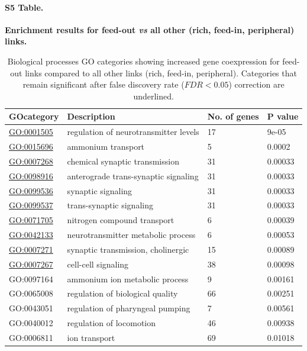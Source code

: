 \documentclass[10pt,letterpaper]{article}
\begin{document}
\paragraph*{S5 Table.}
{\bf Enrichment results for feed-out \textit{vs} all other (rich, feed-in, peripheral) links.}
\begin{table}[]
\centering
\caption{Biological processes GO categories showing increased gene coexpression for feed-out links compared to all other links (rich, feed-in, peripheral). 
Categories that remain significant after false discovery rate ($FDR < 0.05$)  correction are underlined.}
\label{enrichmentFeedOUT}
\begin{tabular}{llll}
\hline
\textbf{GOcategory} & \textbf{Description}                          & \textbf{No. of genes} & \textbf{P value} \\ \hline
\underline{GO:0001505}    & regulation of neurotransmitter levels & 17                & 9e-05         \\
\underline{GO:0015696}    & ammonium transport                    & 5                 & 0.0002        \\
\underline{GO:0007268}    & chemical synaptic transmission        & 31                & 0.00033       \\
\underline{GO:0098916}    & anterograde trans-synaptic signaling  & 31                & 0.00033       \\
\underline{GO:0099536}    & synaptic signaling                    & 31                & 0.00033       \\
\underline{GO:0099537}    & trans-synaptic signaling              & 31                & 0.00033       \\
\underline{GO:0071705}    & nitrogen compound transport           & 6                 & 0.00039       \\
\underline{GO:0042133}    & neurotransmitter metabolic process    & 6                 & 0.00053       \\
\underline{GO:0007271}    & synaptic transmission, cholinergic    & 15                & 0.00089       \\
\underline{GO:0007267}    & cell-cell signaling                   & 38                & 0.00098       \\
GO:0097164          & ammonium ion metabolic process        & 9                 & 0.00161       \\
GO:0065008          & regulation of biological quality      & 66                & 0.00251       \\
GO:0043051          & regulation of pharyngeal pumping      & 7                 & 0.00561       \\
GO:0040012          & regulation of locomotion              & 46                & 0.00938       \\
GO:0006811          & ion transport                         & 69                & 0.01018      
\end{tabular}
\end{table}
\end{document}
